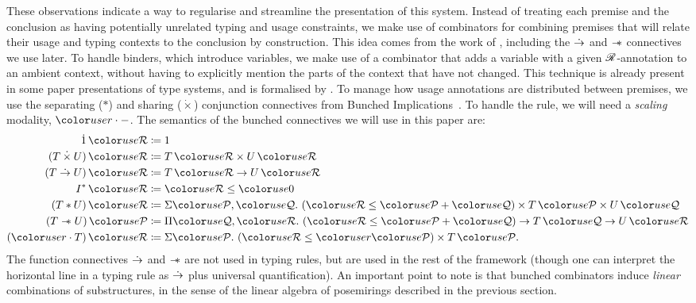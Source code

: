 These observations indicate a way to regularise and streamline the
presentation of this system. Instead of treating each premise and the
conclusion as having potentially unrelated typing and usage
constraints, we make use of combinators for combining premises that will
relate their usage and typing contexts to the conclusion by
construction.
This idea comes from the work of \citet{RPKV20}, including the $\mathrel{\dot\to}$ and
$\mathrel{\mathord{-}\hspace{-0.75ex}*}$ connectives we use later.
To handle binders, which introduce variables, we make
use of a combinator that adds a variable with a given $\mathscr R$-annotation
to an ambient context, without having to explicitly mention the parts
of the context that have not changed. This technique is already
present in some paper presentations of type systems, and is formalised by
\citet{AACMM21}.
To manage how usage annotations are distributed between premises, we use the
separating ($*$) and sharing ($\dot{\times}$) conjunction connectives from
Bunched Implications~\cite{oHP99}.
To handle the  rule, we will need a
\emph{scaling} modality, $\gr r \cdot {-}$. The semantics of the bunched
connectives we will use in this paper are:
  \begin{align*}
    \dot1\,\grR &\coloneqq 1 \\
    (T \dottimes U)\,\grR &\coloneqq T\,\grR \times U\,\grR \\
    (T \dotto U)\,\grR &\coloneqq T\,\grR \to U\,\grR \\
    I^*\,\grR &\coloneqq \grR \leq \gr0 \\
    (T \sep U)\,\grR &\coloneqq \Sigma \grP,\grQ.~\plr{\grR \leq \grP + \grQ}
                       \times T\,\grP \times U\,\grQ \\
    (T \wand U)\,\grP &\coloneqq \Pi \grQ,\grR.~\plr{\grR \leq \grP + \grQ}
                        \to T\,\grQ \to U\,\grR \\
    (\gr r \cdot T)\,\grR &\coloneqq \Sigma \grP.~\plr{\grR \leq \gr r\grP}
                       \times T\,\grP.
  \end{align*}
The function connectives $\mathrel{\dot\to}$ and $\mathrel{\mathord{-}\hspace{-0.75ex}*}$ are not used in typing rules, but
are used in the rest of the framework (though one can interpret the horizontal
line in a typing rule as $\mathrel{\dot\to}$ plus universal quantification).
An important point to note is that bunched combinators induce
\emph{linear} combinations of substructures, in the sense of the
linear algebra of posemirings described in the previous section.

